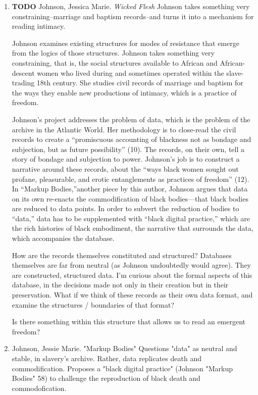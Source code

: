 \documentclass[11pt]{article}
\begin{document}
\begin{enumerate}
\item {\bfseries\sffamily TODO} Johnson, Jessica Marie. \emph{Wicked Flesh}
\label{sec:org567f0b0}
Johnson takes something very constraining--marriage and baptism
records--and turns it into a mechanism for reading intimacy. 

Johnson examines existing structures for modes of resistance that
emerge from the logics of those structures. Johnson takes something
very constraining, that is, the social structures available to African
and African-descent women who lived during and sometimes operated
within the slave-trading 18th century. She studies civil records of
marriage and baptism for the ways they enable new productions of
intimacy, which is a practice of freedom.

Johnson’s project addresses the problem of data, which is the problem
of the archive in the Atlantic World. Her methodology is to close-read
the civil records to create a “promiscuous accounting of blackness not
as bondage and subjection, but as future possibility” (10). The
records, on their own, tell a story of bondage and subjection to
power. Johnson’s job is to construct a narrative around these records,
about the “ways black women sought out profane, pleasurable, and
erotic entanglements as practices of freedom” (12). In “Markup
Bodies,”another piece by this author, Johnson argues that data on its
own re-enacts the commodification of black bodies---that black bodies
are reduced to data points. In order to subvert the reduction of
bodies to “data,” data has to be supplemented with “black digital
practice,” which are the rich histories of black embodiment, the
narrative that surrounds the data, which accompanies the database.

How are the records themselves constituted and structured? Databases
themselves are far from neutral (as Johnson undoubtedly would
agree). They are constructed, structured data. I’m curious about the
formal aspects of this database, in the decisions made not only in
their creation but in their preservation. What if we think of these
records as their own data format, and examine the structures /
boundaries of that format?

Is there something within this structure that allows us to read an
emergent freedom?
\item Johnson, Jessie Marie. "Markup Bodies"
\label{sec:org7a3e345}
Questions "data" as neutral and stable, in slavery's archive. Rather,
data replicates death and commodification. Proposes a "black digital
practice" (Johnson "Markup Bodies" 58) to challenge the reproduction
of black death and commodofication.


\end{enumerate}
\end{document}
